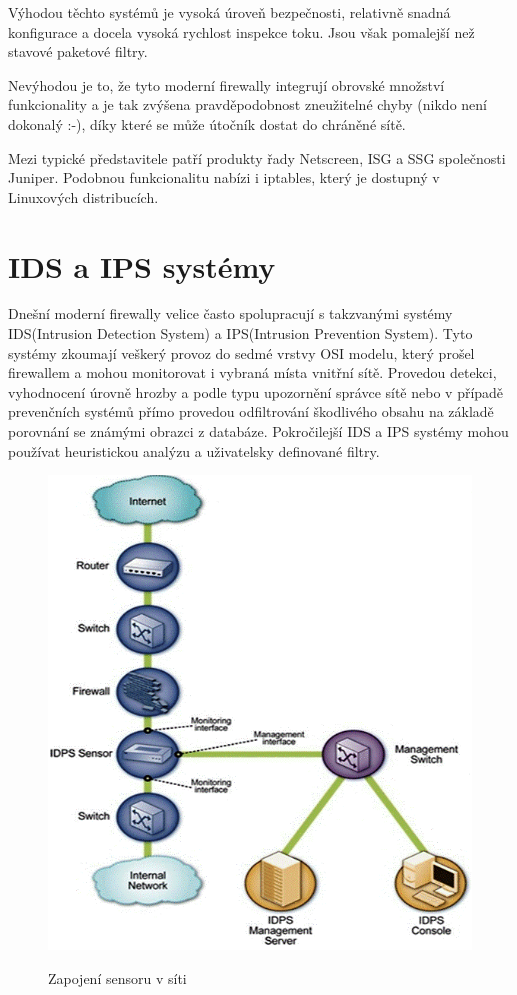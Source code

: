\documentclass[11pt,a4paper]{article}
\begin{document}
Výhodou těchto systémů je vysoká úroveň bezpečnosti, relativně snadná konfigurace a docela vysoká rychlost inspekce toku. Jsou však pomalejší než stavové paketové filtry.

Nevýhodou je to, že tyto moderní firewally integrují obrovské množství funkcionality a je tak zvýšena pravděpodobnost zneužitelné chyby (nikdo není dokonalý :-), díky které se může útočník dostat do chráněné sítě.

Mezi typické představitele patří produkty řady Netscreen, ISG a SSG společnosti Juniper. Podobnou funkcionalitu nabízi i iptables, který je dostupný v Linuxových distribucích. 

\section{IDS a IPS systémy}
Dnešní moderní firewally velice často spolupracují s takzvanými systémy IDS(Intrusion Detection System) a IPS(Intrusion Prevention System). Tyto systémy zkoumají veškerý provoz do sedmé vrstvy OSI modelu, který prošel firewallem a mohou monitorovat i vybraná místa vnitřní sítě. Provedou detekci, vyhodnocení úrovně hrozby a podle typu upozornění správce sítě nebo v případě prevenčních systémů přímo provedou odfiltrování škodlivého obsahu na základě porovnání se známými obrazci z databáze. Pokročilejší IDS a IPS systémy mohou používat heuristickou analýzu a uživatelsky definované filtry. 

\begin{figure}
	\includegraphics[scale=0.4]{./pict/idps.png}
	\label{pic:idps_sen}
	\caption{Zapojení sensoru v síti \cite{ref:idps}}
\end{figure}
\end{document}
